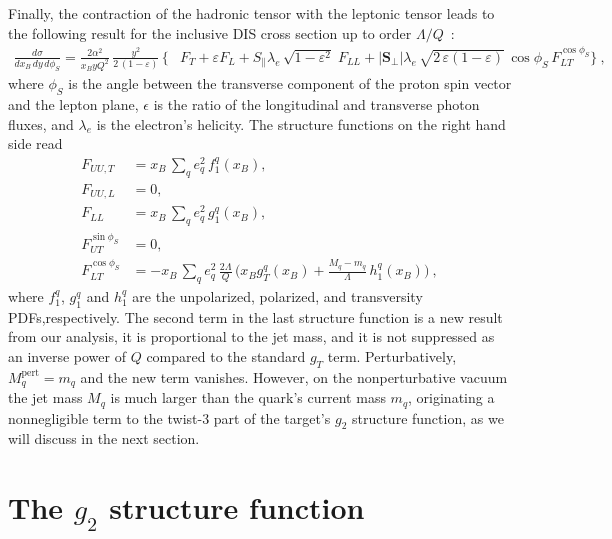 \documentclass[preprintnumbers,floatfix,nofootinbib]{revtex4}
\newcommand{\xbj}{{x_B}}                   %
\newcommand{\mj}{M_q}
\newcommand{\mq}{m_q}
\begin{document}
Finally, the contraction of the hadronic tensor with the leptonic tensor leads
to the following result for the inclusive DIS cross section up to order $\Lambda/Q$~\cite{Bacchetta:2006tn}:
\begin{align}
\frac{d\sigma}{d\xbj \, dy\, d\phi_S}
=
\frac{2 \alpha^2}{\xbj y Q^2}\,
\frac{y^2}{2\,(1-\varepsilon)}\, 
\biggl\{
&F_{T} + \varepsilon F_{L}
+ S_\parallel \lambda_e\,
  \sqrt{1-\varepsilon^2}\; 
F_{LL}
+ |\bm{S}_\perp| \lambda_e\, \sqrt{2\,\varepsilon (1-\varepsilon)}\, 
  \cos\phi_S\, 
F_{LT}^{\cos \phi_S}
 \biggr\} \ ,
\label{e:crossdis}
\end{align}
where $\phi_S$ is the angle between the transverse component of the proton spin vector and the lepton plane, $\epsilon$ is the ratio of the longitudinal and transverse photon fluxes, and $\lambda_e$ is the electron's helicity. 
The structure functions on the right hand side read
\begin{align}
F_{UU ,T} &= \xbj\,\sum_q e_q^2\,f_1^q(\xbj),
\\
F_{UU ,L} &= 0,
\\
F_{LL} &=\xbj\,\sum_q e_q^2\,g_1^q(\xbj),
\label{e:FLLint}
\\
F_{UT}^{\sin \phi_S}&=0,
\label{e:FUTint}
\\
F_{LT}^{\cos \phi_S}&=-\xbj\,\sum_q e_q^2\, \frac{2\Lambda}{Q}\,
\biggl(\xbj  g_T^q(\xbj)
   + \frac{\mj -\mq}{\Lambda} \, h_{1}^q(\xbj) \biggr) \ ,
\label{e:FLTint}
\end{align}
where $f_1^q$, $g_1^q$ and $h_1^q$ are the unpolarized, polarized, and transversity PDFs,respectively.
The second term in the last structure function is a new result from our
analysis, it is proportional to the jet mass, and it is not suppressed as an
inverse power of $Q$ compared to the 
standard $g_T$ term. Perturbatively, $M_q^\text{pert}=m_q$ and the new term vanishes. However, on the nonperturbative vacuum the jet mass $M_q$ is much larger than the quark's current mass $m_q$, originating a nonnegligible term to the twist-3 part of the target's $g_2$ structure function, as we will discuss in the next section.  

 

\section{The $g_2$ structure function}
\end{document}

